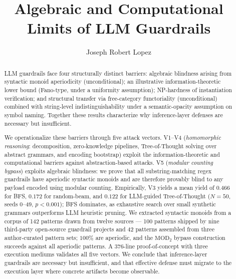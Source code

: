 \documentclass[letterpaper,twocolumn,10pt]{article}
\theoremstyle{definition}
\theoremstyle{remark}
\begin{document}
\title{\Large\bfseries Algebraic and Computational Limits of LLM Guardrails}

\author{Joseph Robert Lopez}
\date{}
\maketitle

\begin{abstract}
LLM guardrails face four structurally distinct barriers:
algebraic blindness arising from syntactic monoid aperiodicity
(unconditional);
an illustrative information-theoretic lower bound (Fano-type, under a
uniformity assumption);
NP-hardness of instantiation verification;
and structural transfer via free-category functoriality (unconditional)
combined with string-level indistinguishability under a semantic-opacity
assumption on symbol naming.
Together these results characterize why inference-layer defenses are necessary but insufficient.

We operationalize these barriers through five attack vectors.
V1--V4 (\emph{homomorphic reasoning}: decomposition, zero-knowledge pipelines,
Tree-of-Thought solving over abstract grammars, and encoding bootstrap) exploit
the information-theoretic and computational barriers against abstraction-based attacks.
V5 (\emph{modular counting bypass}) exploits algebraic blindness: we prove that all
substring-matching regex guardrails have aperiodic syntactic monoids and are therefore
provably blind to any payload encoded using modular counting.
Empirically, V3 yields a mean yield of $0.466$ for BFS, $0.172$ for random-beam,
and $0.122$ for LLM-guided Tree-of-Thought ($N{=}50$, seeds 0--49, $p{<}0.001$);
BFS dominates, as exhaustive search over small synthetic grammars outperforms
LLM heuristic pruning.
We extracted syntactic monoids from a corpus of 142 patterns drawn from
twelve sources --- 100 patterns shipped by nine third-party open-source
guardrail projects and 42 patterns assembled from three author-curated
pattern sets;
$100\%$ are aperiodic, and the $\mathrm{MOD}_2$ bypass construction succeeds against
all aperiodic patterns.
A 376-line proof-of-concept with three execution mediums validates all five vectors.
We conclude that inference-layer guardrails are necessary but insufficient, and that
effective defense must migrate to the execution layer where concrete artifacts
become observable.
\end{abstract}
\end{document}
